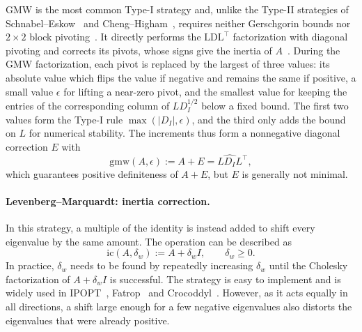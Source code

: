 \documentclass[class=scrbook, crop=false]{standalone}
\begin{document}
\gls{GMW} is the most common Type-I strategy and, 
unlike the Type-II strategies of 
Schnabel--Eskow~\cite{schnabelNewModifiedCholesky1990} and Cheng--Higham~\cite{chengModifiedCholeskyAlgorithm1998},
requires neither Gerschgorin bounds nor $2\times2$ block pivoting~\cite{mcsweeneyModifiedCholeskyDecomposition2017}.
It directly performs the $\mathrm{LDL}^\top$ factorization with diagonal pivoting and corrects its pivots,
whose signs give the inertia of $A$~\cite{gill1981practical}.
During the \gls{GMW} factorization,
each pivot is replaced by the largest of three values:
its absolute value which flips the value if negative and remains the same if positive,
a small value $\epsilon$ for lifting a near-zero pivot,
and the smallest value for keeping the entries of the corresponding column of $L D_I^{1/2}$ below a fixed bound.
The first two values form the Type-I rule $\max(\lvert D_I\rvert, \epsilon)$, 
and the third only adds the bound on $L$ for numerical stability.
The increments thus form a nonnegative diagonal correction $E$ with
\begin{equation*}
    \mathrm{gmw}(A, \epsilon) := A + E = L \hat{D_I} L^\top,
\end{equation*}
which guarantees positive definiteness of $A + E$, but $E$ is generally not minimal.

\paragraph{Levenberg--Marquardt: inertia correction.}
In this strategy,
a multiple of the identity is instead added to shift every eigenvalue by the same amount.
The operation can be described as
    \begin{equation*}
        \mathrm{ic}(A, \delta_w) := A + \delta_w I, \qquad \delta_w \geq 0.
    \end{equation*}
In practice, $\delta_w$ needs to be found by repeatedly increasing $\delta_w$ until the Cholesky factorization of $A + \delta_w I$ is successful.
The strategy is easy to implement and is widely used in IPOPT~\cite{wachter2006implementation}, Fatrop~\cite{vanroye2023fatrop} and Crocoddyl~\cite{mastalli2020crocoddyl}.
However, as it acts equally in all directions,
a shift large enough for a few negative eigenvalues also distorts the eigenvalues that were already positive.
\end{document}
